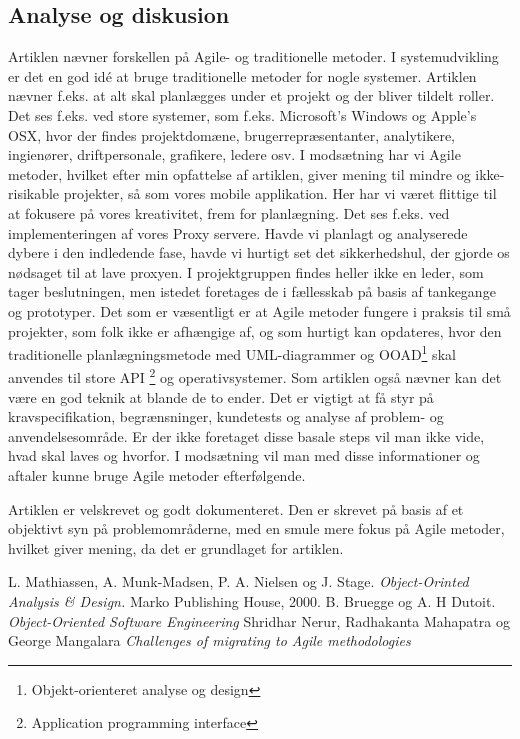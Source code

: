 \documentclass[12pt]{article}
\begin{document}
\subsection{Analyse og diskusion}

Artiklen nævner forskellen på Agile- og traditionelle metoder. I systemudvikling er det en god idé at bruge traditionelle metoder for nogle systemer. Artiklen nævner f.eks. at alt skal planlægges under et projekt og der bliver tildelt roller. Det ses f.eks. ved store systemer, som f.eks. Microsoft's Windows og Apple's OSX, hvor der findes projektdomæne, brugerrepræsentanter, analytikere, ingienører, driftpersonale, grafikere, ledere osv. I modsætning har vi Agile metoder, hvilket efter min opfattelse af artiklen, giver mening til mindre og ikke-risikable projekter, så som vores mobile applikation. Her har vi været flittige til at fokusere på vores kreativitet, frem for planlægning. Det ses f.eks. ved implementeringen af vores Proxy servere. Havde vi planlagt og analyserede dybere i den indledende fase, havde vi hurtigt set det sikkerhedshul, der gjorde os nødsaget til at lave proxyen. I projektgruppen findes heller ikke en leder, som tager beslutningen, men istedet foretages de i fællesskab på basis af tankegange og prototyper. Det som er væsentligt er at Agile metoder fungere i praksis til små projekter, som folk ikke er afhængige af, og som hurtigt kan opdateres, hvor den traditionelle planlægningsmetode med UML-diagrammer og OOAD\footnote{Objekt-orienteret analyse og design} skal anvendes til store API \footnote{Application programming interface} og operativsystemer. Som artiklen også nævner kan det være en god teknik at blande de to ender. Det er vigtigt at få styr på kravspecifikation, begrænsninger, kundetests og analyse af problem- og anvendelsesområde. Er der ikke foretaget disse basale steps vil man ikke vide, hvad skal laves og hvorfor. I modsætning vil man med disse informationer og aftaler kunne bruge Agile metoder efterfølgende. 

Artiklen er velskrevet og godt dokumenteret. Den er skrevet på basis af et objektivt syn på problemområderne, med en smule mere fokus på Agile metoder, hvilket giver mening, da det er grundlaget for artiklen. 

\newpage

\begin{thebibliography}{99}
 L. Mathiassen, A. Munk-Madsen, P. A. Nielsen og J. Stage.
\emph{Object-Orinted Analysis \& Design.} Marko Publishing House, 2000.
 B. Bruegge og A. H Dutoit.
\emph{Object-Oriented Software Engineering}
 Shridhar Nerur, Radhakanta Mahapatra og George Mangalara
\emph{Challenges of migrating to Agile methodologies}

\end{thebibliography}
\end{document}

